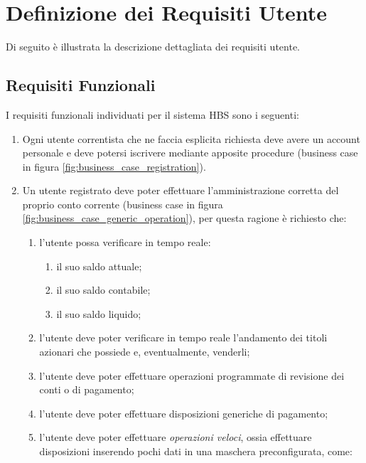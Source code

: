 
\section{Definizione dei Requisiti Utente}

Di seguito \`e illustrata la descrizione dettagliata dei requisiti utente.

\subsection{Requisiti Funzionali}
\label{sec:utente:funzionali}

I requisiti funzionali individuati per il sistema HBS sono i seguenti:

\begin{enumerate}
	\item \label{itm:utente:funzionali:iscrizione} Ogni utente correntista che ne faccia esplicita richiesta deve avere un account personale e deve potersi iscrivere  mediante apposite procedure (business case in figura \ref{fig:business_case_registration}).
	\item \label{itm:utente:funzionali:gestione-conto} Un utente registrato deve poter effettuare l'amministrazione corretta del proprio conto corrente (business case in figura \ref{fig:business_case_generic_operation}), per questa ragione è richiesto che:
	\begin{enumerate}
		\item \label{itm:utente:funzionali:gestione-conto:verifica-saldo} l'utente possa verificare in tempo reale:
			\begin{enumerate}
				\item il suo saldo attuale;
				\item il suo saldo contabile;
				\item il suo saldo liquido;
			\end{enumerate} 
		\item \label{itm:utente:funzionali:gestione-conto:verifica-andamento} l'utente deve poter verificare in tempo reale l'andamento dei titoli azionari che possiede e, eventualmente, venderli;
		\item \label{itm:utente:funzionali:gestione-conto:revisione} l'utente deve poter effettuare operazioni programmate di revisione dei conti o di pagamento;
		\item \label{itm:utente:funzionali:gestione-conto:operazioni} l'utente deve poter effettuare disposizioni generiche di pagamento;
		\item \label{itm:utente:funzionali:gestione-conto:operazioni-veloci} l'utente deve poter effettuare \emph{operazioni veloci}, ossia effettuare disposizioni inserendo pochi dati in una maschera preconfigurata, come:

\end{enumerate}
\end{enumerate}
